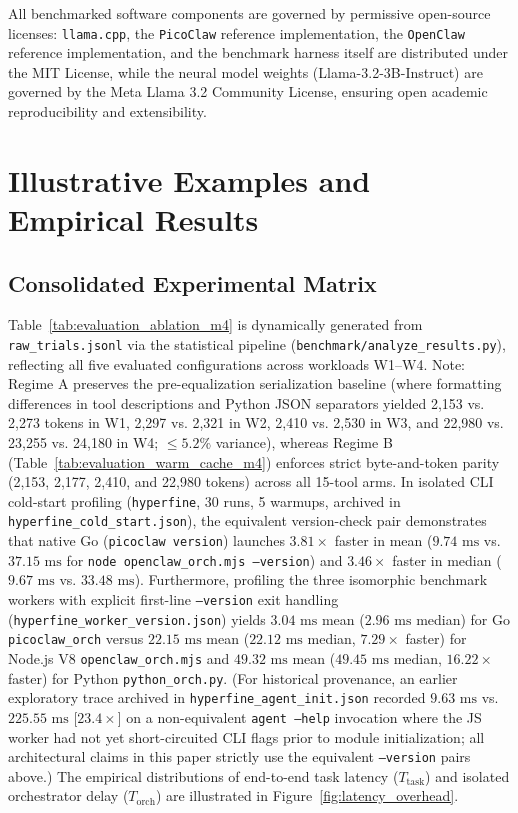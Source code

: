 \documentclass[preprint,12pt,3p]{elsarticle}
\begin{document}
All benchmarked software components are governed by permissive open-source licenses: \texttt{llama.cpp}, the \texttt{PicoClaw} reference implementation, the \texttt{OpenClaw} reference implementation, and the benchmark harness itself are distributed under the MIT License, while the neural model weights (Llama-3.2-3B-Instruct) are governed by the Meta Llama 3.2 Community License, ensuring open academic reproducibility and extensibility.

\section{Illustrative Examples and Empirical Results}
\label{sec:examples}



\subsection{Consolidated Experimental Matrix}
Table~\ref{tab:evaluation_ablation_m4} is dynamically generated from \texttt{raw\_trials.jsonl} via the statistical pipeline (\texttt{benchmark/analyze\_results.py}), reflecting all five evaluated configurations across workloads W1--W4. Note: Regime A preserves the pre-equalization serialization baseline (where formatting differences in tool descriptions and Python JSON separators yielded 2,153 vs. 2,273 tokens in W1, 2,297 vs. 2,321 in W2, 2,410 vs. 2,530 in W3, and 22,980 vs. 23,255 vs. 24,180 in W4; $\le 5.2\%$ variance), whereas Regime B (Table~\ref{tab:evaluation_warm_cache_m4}) enforces strict byte-and-token parity (2,153, 2,177, 2,410, and 22,980 tokens) across all 15-tool arms. In isolated CLI cold-start profiling (\texttt{hyperfine}, 30 runs, 5 warmups, archived in \texttt{hyperfine\_cold\_start.json}), the equivalent version-check pair demonstrates that native Go (\texttt{picoclaw version}) launches $3.81\times$ faster in mean ($9.74\text{ ms}$ vs. $37.15\text{ ms}$ for \texttt{node openclaw\_orch.mjs --version}) and $3.46\times$ faster in median ($9.67\text{ ms}$ vs. $33.48\text{ ms}$). Furthermore, profiling the three isomorphic benchmark workers with explicit first-line \texttt{--version} exit handling (\texttt{hyperfine\_worker\_version.json}) yields $3.04\text{ ms}$ mean ($2.96\text{ ms}$ median) for Go \texttt{picoclaw\_orch} versus $22.15\text{ ms}$ mean ($22.12\text{ ms}$ median, $7.29\times$ faster) for Node.js V8 \texttt{openclaw\_orch.mjs} and $49.32\text{ ms}$ mean ($49.45\text{ ms}$ median, $16.22\times$ faster) for Python \texttt{python\_orch.py}. (For historical provenance, an earlier exploratory trace archived in \texttt{hyperfine\_agent\_init.json} recorded $9.63\text{ ms}$ vs. $225.55\text{ ms}$ [$23.4\times$] on a non-equivalent \texttt{agent --help} invocation where the JS worker had not yet short-circuited CLI flags prior to module initialization; all architectural claims in this paper strictly use the equivalent \texttt{--version} pairs above.) The empirical distributions of end-to-end task latency ($T_{\text{task}}$) and isolated orchestrator delay ($T_{\text{orch}}$) are illustrated in Figure~\ref{fig:latency_overhead}.
\end{document}
